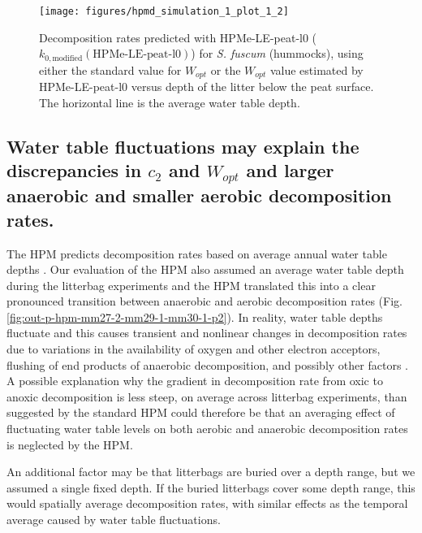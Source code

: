 \documentclass[esd, manuscript]{copernicus}
\begin{document}
\begin{figure}[H]

{\centering \texttt{[image: figures/hpmd\_simulation\_1\_plot\_1\_2]} 

}

\caption{Decomposition rates predicted with HPMe-LE-peat-l0 (\(k_{0,\text{modified}}(\text{HPMe-LE-peat-l0})\)) for \emph{S. fuscum} (hummocks), using either the standard value for \(W_{opt}\) or the \(W_{opt}\) value estimated by HPMe-LE-peat-l0 versus depth of the litter below the peat surface. The horizontal line is the average water table depth.}\label{fig:out-sdm-parameters-standard-vs-estimated-p2}
\end{figure}

\hypertarget{out-discussion-4}{%
\subsection{\texorpdfstring{Water table fluctuations may explain the discrepancies in \(c_2\) and \(W_{opt}\) and larger anaerobic and smaller aerobic decomposition rates.}{Water table fluctuations may explain the discrepancies in c\_2 and W\_\{opt\} and larger anaerobic and smaller aerobic decomposition rates.}}\label{out-discussion-4}}

The HPM predicts decomposition rates based on average annual water table depths \citep{Frolking.2010}. Our evaluation of the HPM also assumed an average water table depth during the litterbag experiments and the HPM translated this into a clear pronounced transition between anaerobic and aerobic decomposition rates (Fig. \ref{fig:out-p-hpm-mm27-2-mm29-1-mm30-1-p2}). In reality, water table depths fluctuate and this causes transient and nonlinear changes in decomposition rates due to variations in the availability of oxygen and other electron acceptors, flushing of end products of anaerobic decomposition, and possibly other factors \citep{Siegel.1995, Blodau.2003, Blodau.2004, Beer.2007, Knorr.2009, Walpen.2018, Campeau.2021, Kim.2021, Treat.2022, Obradovic.2023}. A possible explanation why the gradient in decomposition rate from oxic to anoxic decomposition is less steep, on average across litterbag experiments, than suggested by the standard HPM could therefore be that an averaging effect of fluctuating water table levels on both aerobic and anaerobic decomposition rates is neglected by the HPM.

An additional factor may be that litterbags are buried over a depth range, but we assumed a single fixed depth. If the buried litterbags cover some depth range, this would spatially average decomposition rates, with similar effects as the temporal average caused by water table fluctuations.
\end{document}
